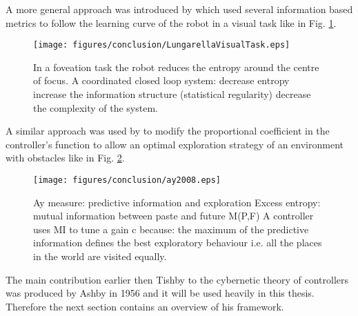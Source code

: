 A more general approach was introduced by \citet{LungarellaInformation} which
used several information based metrics to follow the learning curve of the robot
in a visual task like in Fig. \ref{fig:conclusion:lungarella}.

\begin{figure}[htbp]
\begin{center}
\texttt{[image: figures/conclusion/LungarellaVisualTask.eps]}
\end{center}
\vspace*{4pt}
\caption[Foveation task]{
In a foveation task the robot reduces the entropy
around the centre of focus.
A coordinated closed loop system:
decrease entropy
increase the information structure (statistical regularity)
decrease the complexity of the system.
\label{fig:conclusion:lungarella}}
\end{figure}

A similar approach was used by \citet{AyClosedLoop} to modify the proportional
coefficient in the controller's function to allow an optimal exploration strategy
of an environment with obstacles like in Fig. \ref{fig:conclusion:ay}.

\begin{figure}[htbp]
\begin{center}
\texttt{[image: figures/conclusion/ay2008.eps]}
\end{center}
\vspace*{4pt}
\caption[Ay information measure]
{Ay measure: predictive information and exploration
Excess entropy: mutual information between paste and future M(P,F)
A controller uses MI to tune a gain c because:
the maximum of the predictive information defines the best exploratory
behaviour i.e. all the places in the world are visited equally.
\label{fig:conclusion:ay}}
\end{figure}

The main contribution earlier then Tishby to the cybernetic theory of controllers
was produced by Ashby in 1956 and it will be used heavily in this thesis.
Therefore the next section contains an overview of his framework.
